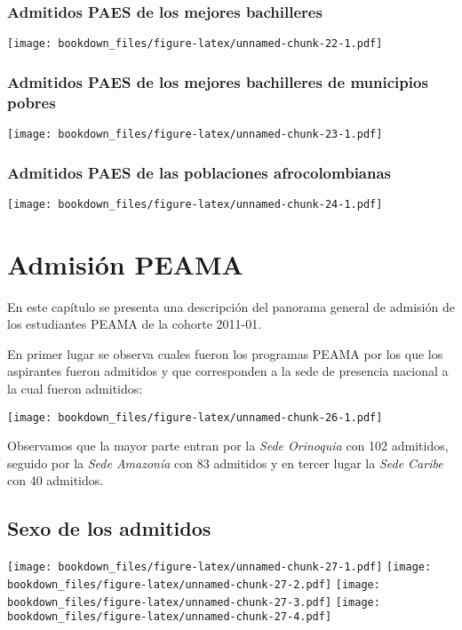 \documentclass[]{article}
\theoremstyle{definition}
\theoremstyle{definition}
\theoremstyle{definition}
\theoremstyle{remark}
\begin{document}
\subsubsection{Admitidos PAES de los mejores
bachilleres}\label{admitidos-paes-de-los-mejores-bachilleres-1}

\texttt{[image: bookdown\_files/figure-latex/unnamed-chunk-22-1.pdf]}

\subsubsection{Admitidos PAES de los mejores bachilleres de municipios
pobres}\label{admitidos-paes-de-los-mejores-bachilleres-de-municipios-pobres-1}

\texttt{[image: bookdown\_files/figure-latex/unnamed-chunk-23-1.pdf]}

\subsubsection{Admitidos PAES de las poblaciones
afrocolombianas}\label{admitidos-paes-de-las-poblaciones-afrocolombianas-1}

\texttt{[image: bookdown\_files/figure-latex/unnamed-chunk-24-1.pdf]}

\section{Admisión PEAMA}\label{admision-peama}

En este capítulo se presenta una descripción del panorama general de
admisión de los estudiantes PEAMA de la cohorte 2011-01.

En primer lugar se observa cuales fueron los programas PEAMA por los que
los aspirantes fueron admitidos y que corresponden a la sede de
presencia nacional a la cual fueron admitidos:

\texttt{[image: bookdown\_files/figure-latex/unnamed-chunk-26-1.pdf]}

Observamos que la mayor parte entran por la \emph{Sede Orinoquia} con
102 admitidos, seguido por la \emph{Sede Amazonía} con 83 admitidos y en
tercer lugar la \emph{Sede Caribe} con 40 admitidos.

\subsection{Sexo de los admitidos}\label{sexo-de-los-admitidos-1}

\texttt{[image: bookdown\_files/figure-latex/unnamed-chunk-27-1.pdf]}
\texttt{[image: bookdown\_files/figure-latex/unnamed-chunk-27-2.pdf]}
\texttt{[image: bookdown\_files/figure-latex/unnamed-chunk-27-3.pdf]}
\texttt{[image: bookdown\_files/figure-latex/unnamed-chunk-27-4.pdf]}
\end{document}
